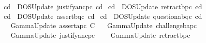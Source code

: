 \begin{isabellebody}
\isamarkupfalse%
\ {\isachardoublequoteopen}cd\ {\isasymequiv}\ DOSUpdate\ justify{\isacharbrackleft}{\kern0pt}a{\isacharcomma}{\kern0pt}n\isactrlsup c{\isasymturnstile}\isactrlsup {\isasymoplus}p\isactrlsup c{\isacharbrackright}{\kern0pt}\ cd\isanewline
{}\isamarkupfalse%
\ {\isachardoublequoteopen}cd\ {\isasymequiv}\ DOSUpdate\ retract{\isacharbrackleft}{\kern0pt}b{\isacharcomma}{\kern0pt}p\isactrlsup c{\isacharcomma}{\kern0pt}{\isasymominus}{\isacharbrackright}{\kern0pt}\ cd\isanewline
{}\isamarkupfalse%
\ {\isachardoublequoteopen}cd\ {\isasymequiv}\ DOSUpdate\ assert{\isacharbrackleft}{\kern0pt}b{\isacharcomma}{\kern0pt}q\isactrlsup c{\isacharbrackright}{\kern0pt}\ cd\isanewline
{}\isamarkupfalse%
\ {\isachardoublequoteopen}cd\ {\isasymequiv}\ DOSUpdate\ question{\isacharbrackleft}{\kern0pt}a{\isacharcomma}{\kern0pt}b{\isacharcomma}{\kern0pt}q\isactrlsup c{\isacharbrackright}{\kern0pt}\ cd\isanewline
{}\isamarkupfalse%
\ {\isachardoublequoteopen}{\isasymDelta}\ {\isasymequiv}\ GammaUpdate\ assert{\isacharbrackleft}{\kern0pt}a{\isacharcomma}{\kern0pt}p\isactrlsup c{\isacharbrackright}{\kern0pt}\ {\isasymGamma}\isactrlsub C{\isachardoublequoteclose}\isanewline
{}\isamarkupfalse%
\ {\isachardoublequoteopen}{\isasymDelta}\ {\isasymequiv}\ GammaUpdate\ challenge{\isacharbrackleft}{\kern0pt}b{\isacharcomma}{\kern0pt}a{\isacharcomma}{\kern0pt}p\isactrlsup c{\isacharbrackright}{\kern0pt}\ {\isasymDelta}\isanewline
{}\isamarkupfalse%
\ {\isachardoublequoteopen}{\isasymDelta}\ {\isasymequiv}\ GammaUpdate\ justify{\isacharbrackleft}{\kern0pt}a{\isacharcomma}{\kern0pt}n\isactrlsup c{\isasymturnstile}\isactrlsup {\isasymoplus}p\isactrlsup c{\isacharbrackright}{\kern0pt}\ {\isasymDelta}\isanewline
{}\isamarkupfalse%
\ {\isachardoublequoteopen}{\isasymDelta}\ {\isasymequiv}\ GammaUpdate\ retract{\isacharbrackleft}{\kern0pt}b{\isacharcomma}{\kern0pt}p\isactrlsup c{\isacharcomma}{\kern0pt}{\isasymominus}{\isacharbrackright}{\kern0pt}\ {\isasymDelta}\isanewline

\end{isabellebody}
